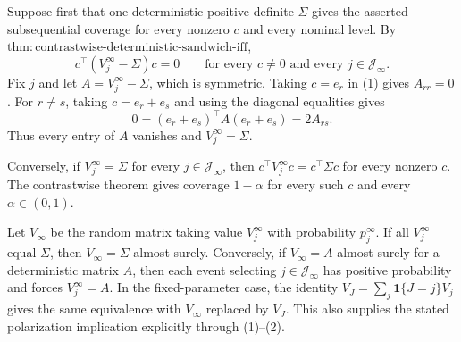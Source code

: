 Suppose first that one deterministic positive-definite \(\Sigma\) gives the asserted subsequential coverage for every nonzero \(c\) and every nominal level. By \(\mathrm{thm:contrastwise\text{-}deterministic\text{-}sandwich\text{-}iff}\),
\[
 c^\top(V_j^\infty-\Sigma)c=0
 \qquad\text{for every }c\ne0\text{ and every }j\in\mathcal J_\infty. \tag{1}
\]
Fix \(j\) and let \(A=V_j^\infty-\Sigma\), which is symmetric. Taking \(c=e_r\) in (1) gives \(A_{rr}=0\). For \(r\ne s\), taking \(c=e_r+e_s\) and using the diagonal equalities gives
\[
 0=(e_r+e_s)^\top A(e_r+e_s)=2A_{rs}. \tag{2}
\]
Thus every entry of \(A\) vanishes and \(V_j^\infty=\Sigma\).

Conversely, if \(V_j^\infty=\Sigma\) for every \(j\in\mathcal J_\infty\), then \(c^\top V_j^\infty c=c^\top\Sigma c\) for every nonzero \(c\). The contrastwise theorem gives coverage \(1-\alpha\) for every such \(c\) and every \(\alpha\in(0,1)\).

Let \(V_\infty\) be the random matrix taking value \(V_j^\infty\) with probability \(p_j^\infty\). If all \(V_j^\infty\) equal \(\Sigma\), then \(V_\infty=\Sigma\) almost surely. Conversely, if \(V_\infty=A\) almost surely for a deterministic matrix \(A\), then each event selecting \(j\in\mathcal J_\infty\) has positive probability and forces \(V_j^\infty=A\). In the fixed-parameter case, the identity \(V_J=\sum_j\mathbf 1\{J=j\}V_j\) gives the same equivalence with \(V_\infty\) replaced by \(V_J\). This also supplies the stated polarization implication explicitly through (1)--(2).